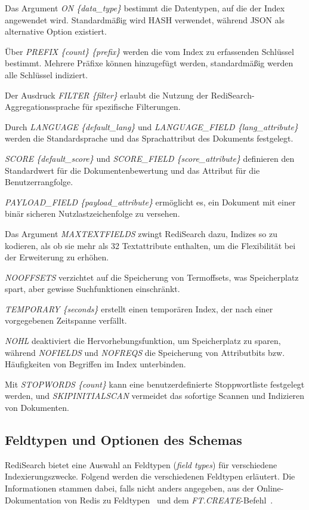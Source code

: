 Das Argument \emph{ON \{data\_type\}} bestimmt die Datentypen, auf die der Index angewendet wird. Standardmäßig wird HASH verwendet, während JSON als alternative Option existiert.

Über \emph{PREFIX \{count\} \{prefix\}} werden die vom Index zu erfassenden Schlüssel bestimmt. Mehrere Präfixe können hinzugefügt werden, standardmäßig werden alle Schlüssel indiziert.

Der Ausdruck \emph{FILTER \{filter\}} erlaubt die Nutzung der RediSearch-Aggregationssprache für spezifische Filterungen.

Durch \emph{LANGUAGE \{default\_lang\}} und \emph{LANGUAGE\_FIELD \{lang\_attribute\}} werden die Standardsprache und das Sprachattribut des Dokuments festgelegt.

\emph{SCORE \{default\_score\}} und \emph{SCORE\_FIELD \{score\_attribute\}} definieren den Standardwert für die Dokumentenbewertung und das Attribut für die Benutzerrangfolge.

\emph{PAYLOAD\_FIELD \{payload\_attribute\}} ermöglicht es, ein Dokument mit einer binär sicheren Nutzlastzeichenfolge zu versehen.

Das Argument \emph{MAXTEXTFIELDS} zwingt RediSearch dazu, Indizes so zu kodieren, als ob sie mehr als 32 Textattribute enthalten, um die Flexibilität bei der Erweiterung zu erhöhen.

\emph{NOOFFSETS} verzichtet auf die Speicherung von Termoffsets, was Speicherplatz spart, aber gewisse Suchfunktionen einschränkt.

\emph{TEMPORARY \{seconds\}} erstellt einen temporären Index, der nach einer vorgegebenen Zeitspanne verfällt.

\emph{NOHL} deaktiviert die Hervorhebungsfunktion, um Speicherplatz zu sparen, während \emph{NOFIELDS} und \emph{NOFREQS} die Speicherung von Attributbits bzw. Häufigkeiten von Begriffen im Index unterbinden.

Mit \emph{STOPWORDS \{count\}} kann eine benutzerdefinierte Stoppwortliste festgelegt werden, und \emph{SKIPINITIALSCAN} vermeidet das sofortige Scannen und Indizieren von Dokumenten.




\subsection{Feldtypen und Optionen des Schemas}\label{sec:redisearch-schema-fieldtypes}
RediSearch bietet eine Auswahl an Feldtypen (\emph{field types}) für verschiedene Indexierungszwecke. Folgend werden die verschiedenen Feldtypen erläutert. Die Informationen stammen dabei, falls nicht anders angegeben, aus der Online-Dokumentation von Redis zu Feldtypen~\cite{redis_ltd_field_nodate} und dem \emph{FT.CREATE}-Befehl~\cite{redis_ltd_ftcreate_nodate}.

